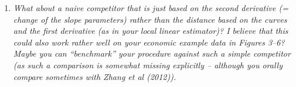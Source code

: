 \documentclass[a4paper,12pt]{article}
\begin{document}
\begin{enumerate}[label=\arabic*.,leftmargin=0.6cm]


\item \textit{What about a naive competitor that is just based on the second derivative (= change of the slope parameters) rather than the distance based on the curves and the first derivative (as in your local linear estimator)? I believe that this could also work rather well on your economic example data in Figures 3--6? Maybe you can ``benchmark'' your procedure against such a simple competitor (as such a comparison is somewhat missing explicitly -- although you orally compare sometimes with Zhang et al (2012)).}


\end{enumerate}
\end{document}
